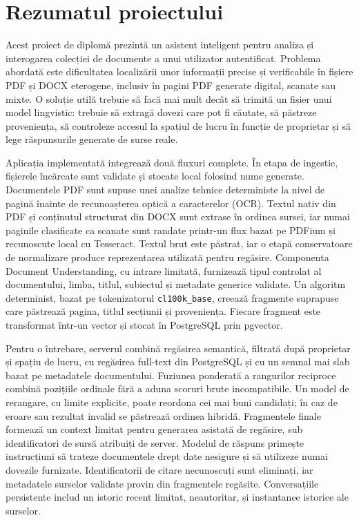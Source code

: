 \chapter*{Rezumatul proiectului}
\begingroup
\small

Acest proiect de diplomă prezintă un asistent inteligent pentru analiza și interogarea colecției de documente a unui utilizator autentificat. Problema abordată este dificultatea localizării unor informații precise și verificabile în fișiere PDF și DOCX eterogene, inclusiv în pagini PDF generate digital, scanate sau mixte. O soluție utilă trebuie să facă mai mult decât să trimită un fișier unui model lingvistic: trebuie să extragă dovezi care pot fi căutate, să păstreze proveniența, să controleze accesul la spațiul de lucru în funcție de proprietar și să lege răspunsurile generate de surse reale.

Aplicația implementată integrează două fluxuri complete. În etapa de ingestie, fișierele încărcate sunt validate și stocate local folosind nume generate. Documentele PDF sunt supuse unei analize tehnice deterministe la nivel de pagină înainte de recunoașterea optică a caracterelor (OCR). Textul nativ din PDF și conținutul structurat din DOCX sunt extrase în ordinea sursei, iar numai paginile clasificate ca scanate sunt randate printr-un flux bazat pe PDFium și recunoscute local cu Tesseract. Textul brut este păstrat, iar o etapă conservatoare de normalizare produce reprezentarea utilizată pentru regăsire. Componenta Document Understanding, cu intrare limitată, furnizează tipul controlat al documentului, limba, titlul, subiectul și metadate generice validate. Un algoritm determinist, bazat pe tokenizatorul \texttt{cl100k\_base}, creează fragmente suprapuse care păstrează pagina, titlul secțiunii și proveniența. Fiecare fragment este transformat într-un vector și stocat în PostgreSQL prin pgvector.

Pentru o întrebare, serverul combină regăsirea semantică, filtrată după proprietar și spațiu de lucru, cu regăsirea full-text din PostgreSQL și cu un semnal mai slab bazat pe metadatele documentului. Fuziunea ponderată a rangurilor reciproce combină pozițiile ordinale fără a aduna scoruri brute incompatibile. Un model de rerangare, cu limite explicite, poate reordona cei mai buni candidați; în caz de eroare sau rezultat invalid se păstrează ordinea hibridă. Fragmentele finale formează un context limitat pentru generarea asistată de regăsire, sub identificatori de sursă atribuiți de server. Modelul de răspuns primește instrucțiuni să trateze documentele drept date nesigure și să utilizeze numai dovezile furnizate. Identificatorii de citare necunoscuți sunt eliminați, iar metadatele surselor validate provin din fragmentele regăsite. Conversațiile persistente includ un istoric recent limitat, neautoritar, și instantanee istorice ale surselor.


